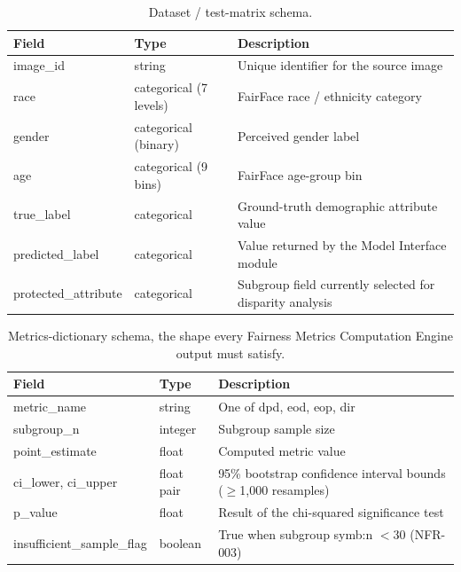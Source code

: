 \begin{table}[htbp]
    \centering
    \renewcommand{\arraystretch}{1.3}
    \caption{Dataset / test-matrix schema.}%
    \label{tab:schema-testmatrix}
    \begin{tabular}{p{3.8cm}p{2.6cm}p{6.9cm}}
        \toprule
        \textbf{Field} & \textbf{Type} & \textbf{Description} \\
        \midrule
        {\ttfamily\footnotesize image\_id} & string & Unique identifier for the source image \\
        {\ttfamily\footnotesize race} & categorical (7 levels) & FairFace race / ethnicity category \\
        {\ttfamily\footnotesize gender} & categorical (binary) & Perceived gender label \\
        {\ttfamily\footnotesize age} & categorical (9 bins) & FairFace age-group bin \\
        {\ttfamily\footnotesize true\_label} & categorical & Ground-truth demographic attribute value \\
        {\ttfamily\footnotesize predicted\_label} & categorical & Value returned by the Model Interface module \\
        {\ttfamily\scriptsize protected\_attribute} & categorical & Subgroup field currently selected for disparity analysis \\
        \bottomrule
    \end{tabular}
\end{table}

\begin{table}[htbp]
    \centering
    \renewcommand{\arraystretch}{1.3}
    \caption{Metrics-dictionary schema, the shape every Fairness Metrics Computation Engine output must satisfy.}%
    \label{tab:schema-metrics}
    \begin{tabular}{p{4.3cm}p{2cm}p{6.9cm}}
        \toprule
        \textbf{Field} & \textbf{Type} & \textbf{Description} \\
        \midrule
        {\ttfamily\footnotesize metric\_name} & string & One of \gls{dpd}, \gls{eod}, \gls{eop}, \gls{dir} \\
        {\ttfamily\footnotesize subgroup\_n} & integer & Subgroup sample size \\
        {\ttfamily\footnotesize point\_estimate} & float & Computed metric value \\
        {\ttfamily\footnotesize ci\_lower}, {\ttfamily\footnotesize ci\_upper} & float pair & 95\% bootstrap confidence interval bounds ($\geq$1{,}000 resamples) \\
        {\ttfamily\footnotesize p\_value} & float & Result of the chi-squared significance test \\
        {\ttfamily\scriptsize insufficient\_sample\_flag} & boolean & True when subgroup \gls{symb:n} $< 30$ (NFR-003) \\
        \bottomrule
    \end{tabular}
\end{table}

